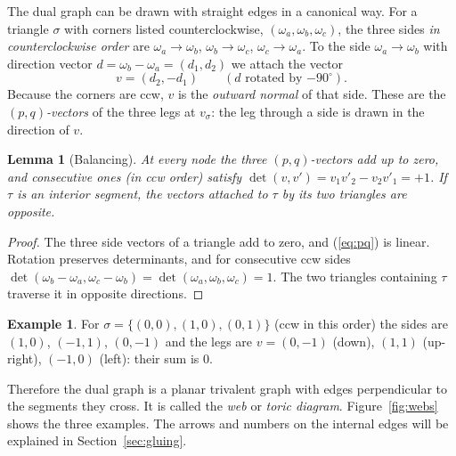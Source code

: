 \documentclass[11pt]{article}
\theoremstyle{plain}
\newtheorem{lemma}[theorem]{Lemma}
\theoremstyle{definition}
\newtheorem{example}[theorem]{Example}
\theoremstyle{remark}
\begin{document}
The dual graph can be drawn with straight edges in a canonical way. For a triangle $\sigma$
with corners listed counterclockwise, $(\omega_a,\omega_b,\omega_c)$, the three sides
\textit{in counterclockwise order} are $\omega_a\rightarrow\omega_b$, $\omega_b\rightarrow\omega_c$,
$\omega_c\rightarrow\omega_a$. To the side $\omega_a\rightarrow\omega_b$ with direction vector
$d=\omega_b-\omega_a=(d_1,d_2)$ we attach the vector
\begin{equation}\label{eq:pq}
v=(d_2,-d_1)\qquad(\text{$d$ rotated by $-90^\circ$}).
\end{equation}
Because the corners are ccw, $v$ is the \textit{outward normal} of that side. These are the
\textit{$(p,q)$-vectors} of the three legs at $v_\sigma$: the leg through a side is drawn in the
direction of $v$.

\begin{lemma}[Balancing]
At every node the three $(p,q)$-vectors add up to zero, and consecutive ones (in ccw order)
satisfy $\det(v,v')=v_1v'_2-v_2v'_1=+1$. If $\tau$ is an interior segment, the vectors attached
to $\tau$ by its two triangles are opposite.
\end{lemma}
\begin{proof}
The three side vectors of a triangle add to zero, and (\ref{eq:pq}) is linear. Rotation
preserves determinants, and for consecutive ccw sides $\det(\omega_b-\omega_a,\omega_c-\omega_b)
=\det(\omega_a,\omega_b,\omega_c)=1$. The two triangles containing $\tau$ traverse it in opposite
directions.
\end{proof}

\begin{example}
For $\sigma=\{(0,0),(1,0),(0,1)\}$ (ccw in this order) the sides are $(1,0)$, $(-1,1)$,
$(0,-1)$ and the legs are $v=(0,-1)$ (down), $(1,1)$ (up-right), $(-1,0)$ (left): their sum
is $0$.
\end{example}

Therefore the dual graph is a planar trivalent graph with edges perpendicular to the segments they
cross. It is called the \textit{web} or \textit{toric diagram}. Figure~\ref{fig:webs} shows the three
examples. The arrows and numbers on the internal edges will be explained in
Section~\ref{sec:gluing}.
\end{document}
